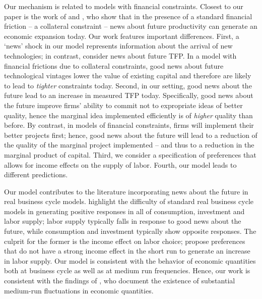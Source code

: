 \documentclass[12pt]{article}
\renewcommand{\cite}{\citet}
\begin{document}
Our mechanism is related to models with financial constraints. Closest to our paper is the work of \cite{JermannQuadrini2007} and  \cite{ChenSong2012}, who show that in the presence of a standard financial friction  -- a collateral constraint -- news about future productivity can generate an economic expansion today. Our work features important differences. First, a `news' shock in our model represents information about the arrival of new technologies; in contrast,  \cite{ChenSong2012} consider news about future TFP. In a model with financial frictions due to collateral constraints, good news about future technological vintages lower the value of existing capital and therefore are likely to lead to \emph{tighter} constraints today. Second, in our setting, good news about the future lead to an increase in measured TFP today. Specifically, good news about the future improve firms' ability to commit not to expropriate ideas of better quality, hence the marginal idea implemented efficiently is of \emph{higher} quality than before. By contrast, in models of financial constraints, firms will implement their better projects first; hence, good news about the future will lead to a reduction of the quality of the marginal project implemented -- and thus to a reduction in the marginal product of capital. Third, we consider a specification of preferences that  allows for income effects on the supply of labor. Fourth, our model leads to different predictions. 


Our model contributes to the literature incorporating news about the future in real business cycle models. \cite{JaimovichRebelo2009} highlight the difficulty of standard real business cycle models in generating positive responses in all of consumption, investment and labor supply; labor supply typically falls in response to good news about the future, while consumption and investment typically show opposite responses. The culprit for the former is the income effect on labor choice; \cite{JaimovichRebelo2009} propose preferences that do not have a strong income effect in the short run to generate an increase in labor supply. Our model is consistent with the behavior of economic quantities both at business cycle as well as at medium run frequencies. Hence, our work is consistent with the findings of \cite{CominGertler2006}, who document the existence of substantial medium-run fluctuations in economic quantities.
\end{document}

